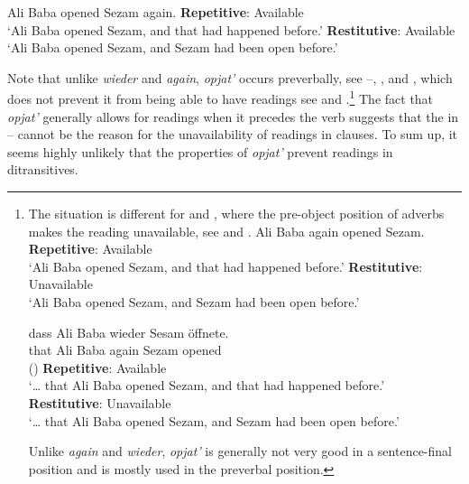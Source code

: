 \documentclass[output=paper]{langscibook}
\begin{document}
 \ea\label{ex:bondarenko:18}
{Ali Baba opened Sezam again.}
\ea \textbf{Repetitive}: Available\\
`Ali Baba opened Sezam, and that had happened before.'
\ex \textbf{Restitutive}: Available\\
`Ali Baba opened Sezam, and Sezam had been open before.'
\z
\z


\noindent Note that unlike \textit{wieder} and \textit{again},  \textit{opjat’} occurs preverbally, see --, , and , which does not prevent it from being able to have  readings see  and .\footnote{The situation is different for  and , where the pre-object position of  adverbs makes the  reading unavailable, see  and .
  \ea\label{ex:bondarenko:fn8exi}
  {Ali Baba again opened Sezam.}
    \ea \textbf{Repetitive}: Available\\
    `Ali Baba opened Sezam, and that had happened before.'
    \ex \textbf{Restitutive}: Unavailable\\
    `Ali Baba opened Sezam, and Sezam had been open before.'
    \z
    \z
    
  \ea\label{ex:bondarenko:fn8exii}
  \gll {\dots} dass Ali Baba wieder Sesam öffnete.\\
  {} that Ali Baba again Sezam opened\\\hfill ()
  \ea  \textbf{Repetitive}: Available\\
  `{\dots} that Ali Baba opened Sezam, and that had happened before.'
  \ex \textbf{Restitutive}: Unavailable\\
  `{\dots} that Ali Baba opened Sezam, and Sezam had been open before.'
  \z
  \z
  
\noindent Unlike  \textit{again} and  \textit{wieder},  \textit{opjat’} is generally not very good in a sentence-final position and is mostly used in the preverbal position.} The fact that \textit{opjat’} generally allows for  readings when it precedes the verb suggests that the  in -- cannot be the reason for the unavailability of  readings in  clauses. To sum up, it seems highly unlikely that the properties of \textit{opjat’} prevent  readings in  ditransitives.
\end{document}
